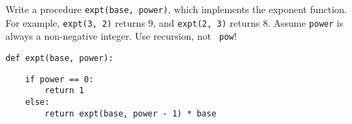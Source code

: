 \question Write a procedure {\tt expt(base, power)}, which implements the
exponent function. For example, {\tt expt(3, 2)} returns 9, and {\tt expt(2, 3)}
returns 8. Assume {\tt power} is always a non-negative integer.  Use recursion, not {\tt
pow}!

\begin{lstlisting}
def expt(base, power):
\end{lstlisting}
\begin{solution}[1.7in]
\begin{lstlisting}
    if power == 0:
        return 1
    else:
        return expt(base, power - 1) * base
\end{lstlisting}
\end{solution}
